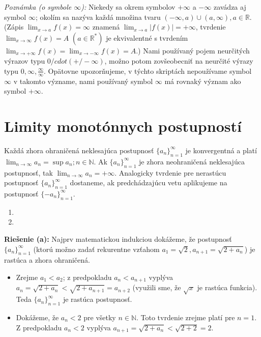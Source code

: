 \textit{Poznámka (o symbole $\infty$):}
Niekedy sa okrem symbolov $+\infty$ a $-\infty$ zavádza aj symbol $\infty$; okolím sa nazýva každá množina tvaru $(-\infty,a)\cup (a,\infty), a \in \mathbb{R}$. (Zápis $\lim_{x \rightarrow a}f(x)=\infty$ znamená $\lim_{x \rightarrow a}|f(x)|=+\infty$, tvrdenie $\lim_{x \rightarrow \infty} f(x)=A$   $(a \in \mathbb{R^*})$ je ekvivalentné s tvrdením $\lim_{x \rightarrow +\infty}f(x)=\lim_{x \rightarrow -\infty}f(x)=A$.) Nami používaný pojem neurčitých výrazov typu $0 /cdot (+/- \infty)$, možno potom zovšeobecniť na neurčité výrazy typu $0, \infty, \frac{\infty}{\infty}$. Opätovne upozorňujeme, v týchto skriptách nepoužívame symbol $\infty$ v takomto význame, nami používaný symbol $\infty$ má rovnaký význam ako symbol $+\infty$.

\section{Limity monotónnych postupností}
\begin{veta}
Každá zhora ohraničená neklesajúca postupnosť ${\{a_n\}}_{n=1}^\infty$ je konvergentná a platí $\lim_{n \rightarrow \infty} a_n=\sup {a_n;n \in \mathbb{N}}$.
Ak ${\{a_n\}}_{n=1}^\infty$ je zhora neohraničená neklesajúca postupnosť, tak $\lim_{n \rightarrow \infty} a_n=+\infty$.
Analogicky tvrdenie pre nerastúcu postupnosť ${\{a_n\}}_{n=1}^\infty$  dostaneme, ak predchádzajúcu vetu aplikujeme na postupnosť ${\{-a_n\}}_{n=1}^\infty$.
\end{veta}

\begin{enumerate}[resume]
  \item {}
  \item {}
\end{enumerate}

\textbf{Riešenie (a):}
Najprv matematickou indukciou dokážeme, že postupnosť ${\{a_n\}}_{n=1}^\infty$ (ktorú možno zadať rekurentne vzťahom $a_1=\sqrt{2},a_{n+1}=\sqrt{2+a_n}$) je rastúca a zhora ohraničená.
\begin{itemize}
\item Zrejme $a_1<a_2$; z predpokladu $a_n<a_{n+1}$ vyplýva $a_n=\sqrt{2+a_n}<\sqrt{2+a_{n+1}}=a_{n+2}$ (využili sme, že $\sqrt{x}$ je rastúca funkcia). Teda ${\{a_n\}}_{n=1}^\infty$ je rastúca postupnosť.
\item Dokážeme, že $a_n<2$ pre všetky $n \in \mathbb{N}$. Toto tvrdenie zrejme platí pre $n=1$. Z predpokladu $a_n<2$ vyplýva $a_{n+1}=\sqrt{2+a_{n}}<\sqrt{2+2}=2$.
\end{itemize}


